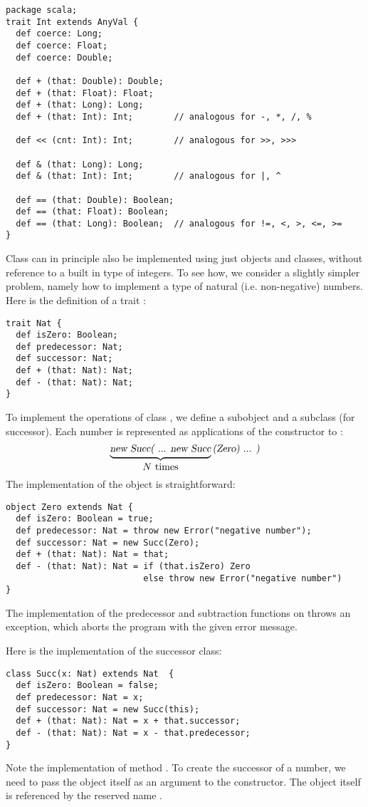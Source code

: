 \begin{lstlisting}
package scala;
trait Int extends AnyVal { 
  def coerce: Long;
  def coerce: Float;
  def coerce: Double;

  def + (that: Double): Double;
  def + (that: Float): Float;
  def + (that: Long): Long;
  def + (that: Int): Int;        // analogous for -, *, /, %

  def << (cnt: Int): Int;        // analogous for >>, >>>

  def & (that: Long): Long;
  def & (that: Int): Int;        // analogous for |, ^

  def == (that: Double): Boolean;
  def == (that: Float): Boolean;
  def == (that: Long): Boolean;  // analogous for !=, <, >, <=, >=
}
\end{lstlisting}

Class  can in principle also be implemented using just
objects and classes, without reference to a built in type of
integers. To see how, we consider a slightly simpler problem, namely
how to implement a type  of natural (i.e. non-negative)
numbers. Here is the definition of a trait :
\begin{lstlisting}
trait Nat {
  def isZero: Boolean;
  def predecessor: Nat;
  def successor: Nat;
  def + (that: Nat): Nat;
  def - (that: Nat): Nat;
}
\end{lstlisting}
To implement the operations of class , we define a subobject
 and a subclass  (for successor). Each number
 is represented as  applications of the 
constructor to :
\[
\underbrace{\mbox{\sl new Succ( ... new Succ}}_{\mbox{$N$ times}}\mbox{\sl (Zero) ... )}
\]
The implementation of the  object is straightforward:
\begin{lstlisting}
object Zero extends Nat {
  def isZero: Boolean = true;
  def predecessor: Nat = throw new Error("negative number");
  def successor: Nat = new Succ(Zero);
  def + (that: Nat): Nat = that;
  def - (that: Nat): Nat = if (that.isZero) Zero 
                           else throw new Error("negative number")
}
\end{lstlisting}

The implementation of the predecessor and subtraction functions on
 throws an  exception, which aborts the program
with the given error message.

Here is the implementation of the successor class:
\begin{lstlisting}
class Succ(x: Nat) extends Nat  {
  def isZero: Boolean = false;
  def predecessor: Nat = x;
  def successor: Nat = new Succ(this);
  def + (that: Nat): Nat = x + that.successor;
  def - (that: Nat): Nat = x - that.predecessor;
}
\end{lstlisting}
Note the implementation of method . To create the
successor of a number, we need to pass the object itself as an
argument to the  constructor.  The object itself is
referenced by the reserved name .   

